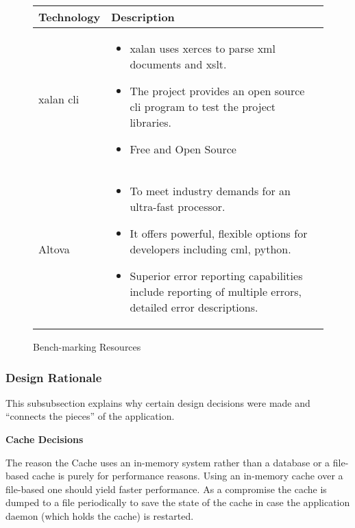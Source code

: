 \begin{figure}
  \centering
  \begin{tabular}{ | l | p{10cm} |}
    \hline
    Technology & Description  \\ \hline
    \gls{xalan} \gls{cli}&
    \begin{itemize}
      \item \gls{xalan} uses \gls{xerces} to parse \gls{xml} documents and \gls{xslt}.
      \item The project provides an open source \gls{cli} program to test the project libraries.
      \item Free and Open Source
    \end{itemize} \\ \hline
    Altova &
    \begin{itemize}
      \item To meet industry demands for an ultra-fast processor.
      \item It offers powerful, flexible options for developers including cml, python.
      \item Superior error reporting capabilities include reporting of multiple errors, detailed error descriptions.
    \end{itemize} \\ \hline
  \end{tabular}
  \caption{Bench-marking Resources}
\end{figure}


\subsubsection{Design Rationale}

This subsubsection explains why certain design decisions were made and ``connects the pieces'' of the application.

\textbf{Cache Decisions}

The reason the Cache uses an in-memory system rather than a database or a file-based cache is purely for performance reasons.
Using an in-memory cache over a file-based one should yield faster performance.
As a compromise the cache is dumped to a file periodically to save the state of the cache in case the application daemon (which holds the cache) is restarted.

